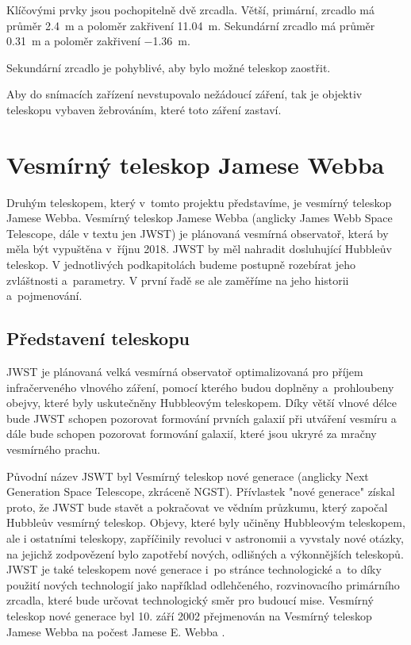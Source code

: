 \documentclass[a4paper,11pt]{article}
\begin{document}
Klíčovými prvky jsou pochopitelně dvě zrcadla. Větší, primární, zrcadlo má průměr \SI{2.4}{\meter} a poloměr zakřivení \SI{11.04}{\meter}. Sekundární zrcadlo má průměr \SI{0.31}{\meter} a poloměr zakřivení \SI{-1.36}{\meter}.

Sekundární zrcadlo je pohyblivé, aby bylo možné teleskop zaostřit.

Aby do snímacích zařízení nevstupovalo nežádoucí záření, tak je objektiv teleskopu vybaven žebrováním, které toto záření zastaví.

\section{Vesmírný teleskop Jamese Webba}

Druhým teleskopem, který v~tomto projektu představíme, je vesmírný teleskop Jamese Webba. Vesmírný teleskop Jamese Webba (anglicky James Webb Space Telescope, dále v textu jen JWST) je plánovaná vesmírná observatoř, která by měla být vypuštěna v~říjnu 2018. JWST by měl nahradit dosluhující Hubbleův teleskop. V jednotlivých podkapitolách budeme postupně rozebírat jeho zvláštnosti a~parametry. V první řadě se ale zaměříme na jeho historii a~pojmenování.

\subsection{Představení teleskopu} 
JWST je plánovaná velká vesmírná observatoř optimalizovaná pro příjem infračerveného vlnového záření, pomocí kterého budou doplněny a~prohloubeny obejvy, které byly uskutečněny Hubbleovým teleskopem.
Díky větší vlnové délce bude JWST schopen pozorovat formování prvních galaxií při utváření vesmíru a dále bude schopen pozorovat formování galaxií, které jsou ukryré za mračny vesmírného prachu.

Původní název JSWT byl Vesmírný teleskop nové generace (anglicky Next Generation Space Telescope, zkráceně NGST). Přívlastek "nové generace" získal proto, že JWST bude stavět a pokračovat ve vědním průzku\-mu, který započal Hubbleův vesmírný teleskop. Objevy, které byly učiněny Hubbleovým teleskopem, ale i ostatními teleskopy, zapříčinily revoluci v astronomii a vyvstaly nové otázky, na jejichž zodpovězení bylo zapotřebí nových, odlišných a výkonnějších teleskopů. 
JWST je také teleskopem nové generace i~po stránce technologické a~to díky použití nových technologií jako například odlehčeného, rozvinovacího primárního zrcadla, které bude určovat technologický směr pro budoucí mise.
Vesmírný teleskop nové generace byl 10. září 2002 přejmenován na Vesmírný teleskop Jamese Webba na počest Jamese E. Webba \cite{nasaFAQ}.
 
\end{document}
